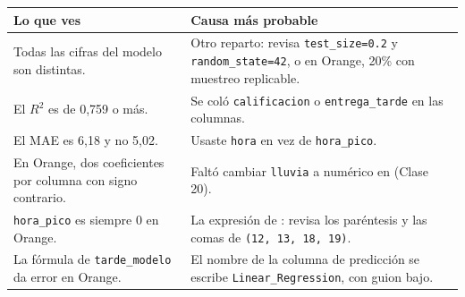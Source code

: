 \documentclass[11pt]{article}
\newcommand{\widget}[1]{\leavevmode{\color{esumerNavyDark}\textbf{#1}}}
\begin{document}
\small
\renewcommand{\arraystretch}{1.2}
\begin{tabularx}{\textwidth}{@{}>{\raggedright\arraybackslash}p{5.8cm} >{\raggedright\arraybackslash}X@{}}
\toprule
\textbf{Lo que ves} & \textbf{Causa más probable}\\
\midrule
Todas las cifras del modelo son distintas. & Otro reparto: revisa \texttt{test\_size=0.2} y \texttt{random\_state=42}, o en Orange, 20\% con muestreo replicable.\\
El $R^2$ es de 0,759 o más. & Se coló \texttt{calificacion} o \texttt{entrega\_tarde} en las columnas.\\
El MAE es 6,18 y no 5,02. & Usaste \texttt{hora} en vez de \texttt{hora\_pico}.\\
En Orange, dos coeficientes por columna con signo contrario. & Faltó cambiar \texttt{lluvia} a numérico en \widget{File} (Clase 20).\\
\texttt{hora\_pico} es siempre 0 en Orange. & La expresión de \widget{Formula}: revisa los paréntesis y las comas de \texttt{(12, 13, 18, 19)}.\\
La fórmula de \texttt{tarde\_modelo} da error en Orange. & El nombre de la columna de predicción se escribe \texttt{Linear\_Regression}, con guion bajo.\\
\bottomrule
\end{tabularx}\par
\renewcommand{\arraystretch}{1.0}
\normalsize
\end{document}
